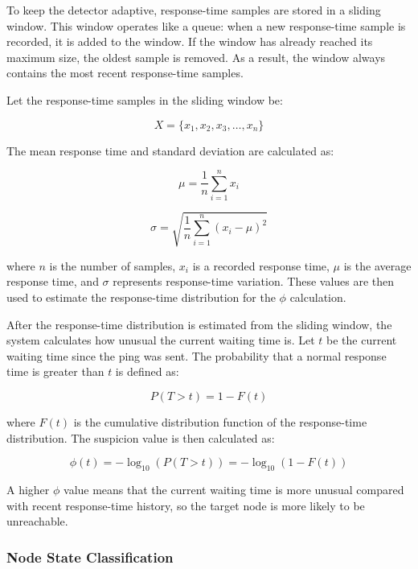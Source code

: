 To keep the detector adaptive, response-time samples are stored in a sliding window. This window operates like a queue:
when a new response-time sample is recorded, it is added to the window. If the window has already reached its maximum
size, the oldest sample is removed. As a result, the window always contains the most recent response-time samples.

Let the response-time samples in the sliding window be:

\begin{equation}
  X = \{x_1, x_2, x_3, \ldots, x_n\}
\end{equation}

The mean response time and standard deviation are calculated as:

\begin{equation}
  \mu = \frac{1}{n}\sum_{i=1}^{n}x_i
\end{equation}

\begin{equation}
  \sigma = \sqrt{\frac{1}{n}\sum_{i=1}^{n}(x_i - \mu)^2}
\end{equation}

where $n$ is the number of samples, $x_i$ is a recorded response time, $\mu$ is the average response time, and $\sigma$
represents response-time variation. These values are then used to estimate the response-time distribution for the
$\phi$ calculation.

After the response-time distribution is estimated from the sliding window, the system calculates how unusual the
current waiting time is. Let $t$ be the current waiting time since the ping was sent. The probability that a normal
response time is greater than $t$ is defined as:

\begin{equation}
  P(T > t) = 1 - F(t)
\end{equation}

where $F(t)$ is the cumulative distribution function of the response-time distribution. The suspicion value is then
calculated as:

\begin{equation}
  \phi(t) = -\log_{10}(P(T > t)) = -\log_{10}(1 - F(t))
\end{equation}

A higher $\phi$ value means that the current waiting time is more unusual compared with recent response-time history,
so the target node is more likely to be unreachable.

\subsubsection{Node State Classification}
\label{subsubsec:node_state_classification}


